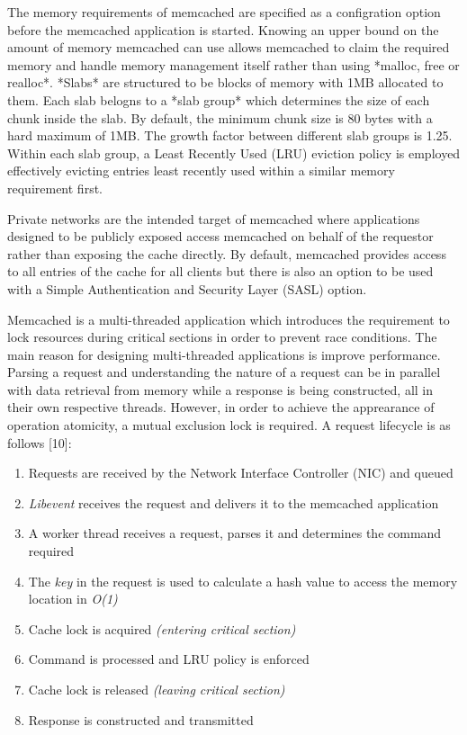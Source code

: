 The memory requirements of memcached are specified as a configration option before the memcached application is started. Knowing an upper bound on the amount of memory memcached can use allows memcached to claim the required memory and handle memory management itself rather than using *malloc, free or realloc*. *Slabs* are structured to be blocks of memory with 1MB allocated to them. Each slab belogns to a *slab group* which determines the size of each chunk inside the slab. By default, the minimum chunk size is 80 bytes with a hard maximum of 1MB. The growth factor between different slab groups is 1.25. Within each slab group, a Least Recently Used (LRU) eviction policy is employed effectively evicting entries least recently used within a similar memory requirement first.

Private networks are the intended target of memcached where applications designed to be publicly exposed access memcached on behalf of the requestor rather than exposing the cache directly. By default, memcached provides access to all entries of the cache for all clients but there is also an option to be used with a Simple Authentication and Security Layer (SASL) option.

Memcached is a multi-threaded application which introduces the requirement to lock resources during critical sections in order to prevent race conditions. The main reason for designing multi-threaded applications is improve performance. Parsing a request and understanding the nature of a request can be in parallel with data retrieval from memory while a response is being constructed, all in their own respective threads. However, in order to achieve the apprearance of operation atomicity, a mutual exclusion lock is required. A request lifecycle is as follows [10]:

\begin{enumerate}
    \item Requests are received by the Network Interface Controller (NIC) and queued
    \item \emph{Libevent} receives the request and delivers it to the memcached application
    \item A worker thread receives a request, parses it and determines the command required
    \item The \emph{key} in the request is used to calculate a hash value to access the memory location in \emph{O(1)}
    \item Cache lock is acquired \emph{(entering critical section)}
    \item Command is processed and LRU policy is enforced
    \item Cache lock is released \emph{(leaving critical section)}
    \item Response is constructed and transmitted
\end{enumerate}

